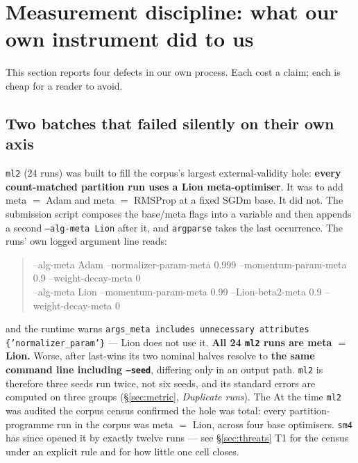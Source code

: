 \documentclass[10pt,letterpaper]{article}
\newcommand{\arm}[1]{\texttt{#1}}
\begin{document}
\section{Measurement discipline: what our own instrument did to us}
\label{sec:discipline}

This section reports four defects in our own process. Each cost a claim; each is cheap for a
reader to avoid.

\subsection{Two batches that failed silently on their own axis}
\label{sec:silent-failures}

\arm{ml2} (24 runs) was built to fill the corpus's largest external-validity hole: \textbf{every
count-matched partition run uses a Lion meta-optimiser}. It was to add meta $=$ Adam and
meta $=$ RMSProp at a fixed SGDm base. It did not. The submission script composes the base/meta
flags into a variable and then appends a second \texttt{--alg-meta Lion} after it, and
\texttt{argparse} takes the last occurrence. The runs' own logged argument line reads:

\begin{quote}\ttfamily\footnotesize
--alg-meta Adam --normalizer-param-meta 0.999 --momentum-param-meta 0.9 --weight-decay-meta 0\\
--alg-meta Lion --momentum-param-meta 0.99 --Lion-beta2-meta 0.9 --weight-decay-meta 0
\end{quote}

and the runtime warns \texttt{args\_meta includes unnecessary attributes \{'normalizer\_param'\}}
--- Lion does not use it. \textbf{All 24 \arm{ml2} runs are meta $=$ Lion.} Worse, after last-wins
its two nominal halves resolve to \textbf{the same command line including \texttt{--seed}},
differing only in an output path. \arm{ml2} is therefore three seeds run twice, not six seeds, and
its standard errors are computed on three groups (\S\ref{sec:metric}, \emph{Duplicate runs}). The
At the time \arm{ml2} was audited the corpus census confirmed the hole was total: every
partition-programme run in the corpus was meta $=$ Lion, across four base optimisers. \arm{sm4}
has since opened it by exactly twelve runs --- see \S\ref{sec:threats} T1 for the census under an
explicit rule and for how little one cell closes.
\end{document}
